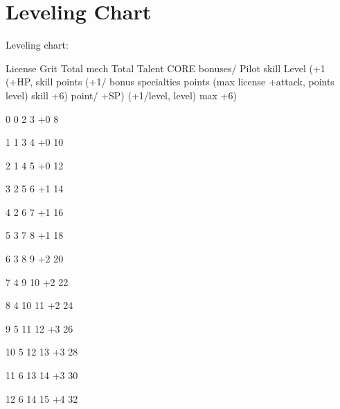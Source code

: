 \chapter{Leveling Chart}

 Leveling chart:

       License
   Grit        Total mech       Total Talent  CORE bonuses/           Pilot skill
       Level (+1   (+HP,      skill
           points (+1/   bonus specialties       points (max
       license    +attack,    points
          level)                                skill +6)
       point/     +SP)        (+1/level,
       level)                 max +6)

       0           0           2               3              +0                     8

       1           1           3               4              +0                      10

       2           1           4               5              +0                      12

       3           2           5               6              +1                      14

       4           2           6               7              +1                      16

       5           3           7               8              +1                      18

       6           3           8               9              +2                      20

       7           4           9               10             +2                      22

       8           4          10               11             +2                      24

       9           5          11               12             +3                      26

       10          5          12               13             +3                      28

       11          6          13               14             +3                      30

       12          6          14               15             +4                      32

